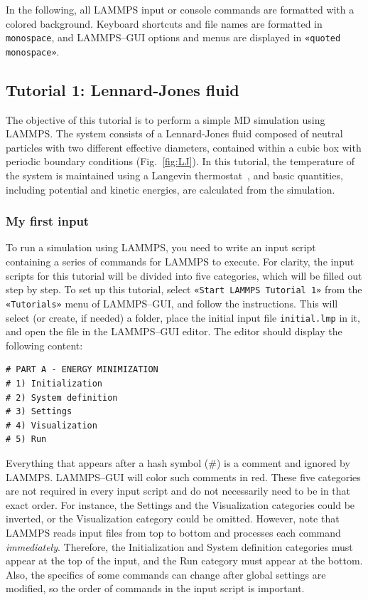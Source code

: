 \documentclass[9pt,tutorial]{livecoms}
\newcommand{\lmpcmd}[1]{\hspace{0pt}\colorbox{listing}{\textcolor{command}{\small{#1}}}\hspace{0pt}} %
\newcommand{\flecmd}[1]{\textcolor{command}{\texttt{#1}}} %
\newcommand{\guicmd}[1]{\textcolor{command}{\texttt{«#1»}}} %
\begin{document}
In the following, all LAMMPS input or console commands are formatted
with a \lmpcmd{colored background}.  Keyboard shortcuts and
file names are formatted in \flecmd{monospace}, and LAMMPS--GUI options and menus
are displayed in \guicmd{quoted monospace}.

\subsection{Tutorial 1: Lennard-Jones fluid}
\label{lennard-jones-label}

The objective of this tutorial is to perform a simple MD simulation
using LAMMPS.  The system consists of a Lennard-Jones fluid composed of neutral
particles with two different effective diameters, contained within a
cubic box with periodic boundary conditions (Fig.~\ref{fig:LJ}).  In
this tutorial, the temperature of the system is maintained using a
Langevin thermostat~\cite{schneider1978molecular}, and basic quantities,
including potential and kinetic energies, are calculated from the simulation.

\subsubsection{My first input}

To run a simulation using LAMMPS, you need to write an input script containing
a series of commands for LAMMPS to execute.  For clarity, the
input scripts for this tutorial will be divided into five categories,
which will be filled out step by step.  To set up this tutorial, select
\guicmd{Start LAMMPS Tutorial 1} from the \guicmd{Tutorials} menu of LAMMPS--GUI, and
follow the instructions.  This will select (or create, if needed) a folder,
place the initial input file \flecmd{initial.lmp} in it, and
open the file in the LAMMPS--GUI editor.  The editor should display the
following content:
\begin{lstlisting}
# PART A - ENERGY MINIMIZATION
# 1) Initialization
# 2) System definition
# 3) Settings
# 4) Visualization
# 5) Run
\end{lstlisting}
Everything that appears after a hash symbol ($\#$) is a comment
and ignored by LAMMPS.  LAMMPS--GUI will color such comments in red.
These five categories are not required in every input script and do not
necessarily need to be in that exact order.  For instance, the \lmpcmd{Settings}
and the \lmpcmd{Visualization} categories could be inverted, or
the \lmpcmd{Visualization} category could be omitted.  However, note that
LAMMPS reads input files from top to bottom and processes each command
\emph{immediately}.  Therefore, the \lmpcmd{Initialization} and
\lmpcmd{System definition} categories must appear at the top of the
input, and the \lmpcmd{Run} category must appear at the bottom.  Also, the
specifics of some commands can change after global settings are modified, so the
order of commands in the input script is important.
\end{document}
